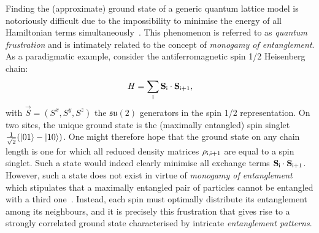 \bigskip\noindent Finding the (approximate) ground state of a generic quantum lattice model is notoriously difficult due to the impossibility to minimise the energy of all Hamiltonian terms simultaneously~\cite{Verstraete2006a}. This phenomenon is referred to as \emph{quantum frustration} and is intimately related to the concept of \emph{monogamy of entanglement}. As a paradigmatic example, consider the antiferromagnetic spin 1/2 Heisenberg chain:
\begin{equation}
	H = \sum_{\mathsf{i}} {\bf S}_{\mathsf{i}} \cdot {\bf S}_{\mathsf{i}+1},
\end{equation}
with $\vec S=(S^x,S^y,S^z)$ the $\mathfrak{su}(2)$ generators in the spin 1/2 representation. On two sites, the unique ground state is the (maximally entangled) spin singlet $\frac{1}{\sqrt 2}( | 01 \rangle - | 10 \rangle)$. One might therefore hope that the ground state on any chain length is one for which all reduced density matrices $\rho_{\mathsf{i},\mathsf{i}+1}$ are equal to a spin singlet. Such a state would indeed clearly minimise all exchange terms ${\bf S}_{\mathsf{i}}\cdot{\bf S}_{\mathsf{i}+1}$. However, such a state does not exist in virtue of \emph{monogamy of entanglement} which stipulates that a maximally entangled pair of particles cannot be entangled with a third one~\cite{Coffman1999,Osborne2006}. Instead, each spin must optimally distribute its entanglement among its neighbours, and it is precisely this frustration that gives rise to a strongly correlated ground state characterised by intricate \emph{entanglement patterns}.

